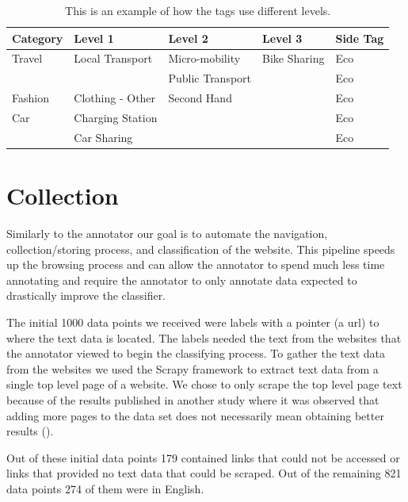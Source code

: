 \begin{table}[h]
\begin{tabular}{|l|l|l|l|l|}
\hline
Category       & Level 1                     & Level 2                       & Level 3      & Side Tag \\ \hline
Travel         & Local Transport             & Micro-mobility                & Bike Sharing & Eco      \\ \hline
               &                             & Public Transport              &              & Eco      \\ \hline
Fashion        & Clothing - Other            & Second Hand                   &              & Eco      \\ \hline
Car            & Charging Station            &                               &              & Eco      \\ \hline
               & Car Sharing                 &                               &              & Eco      \\ \hline
\end{tabular}
\caption{This is an example of how the tags use different levels.}
\label{tab:tags}
\end{table}

\section{Collection}

Similarly to the annotator our goal is to automate the navigation, collection/storing process, and classification of the website. This pipeline speeds up the browsing process and can allow the annotator to spend much less time annotating and require the annotator to only annotate data expected to drastically improve the classifier.

The initial 1000 data points we received were labels with a pointer (a url) to where the text data is located. The labels needed the text from the websites that the annotator viewed to begin the classifying process. To gather the text data from the websites we used the Scrapy framework to extract text data from a single top level page of a website. We chose to only scrape the top level page text because
of the results published in another study where it was observed that adding more pages to the data set does not necessarily mean obtaining better results (\cite{sahid2019ecommerce}). 

Out of these initial data points 179 contained links that could not be accessed or links that provided no text data that could be scraped. Out of the remaining 821 data points 274 of them were in English. 

